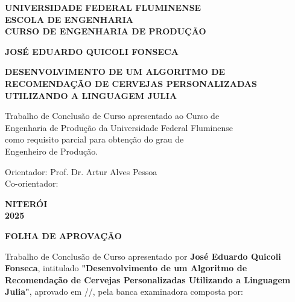 \documentclass[12pt,a4paper]{article}
\begin{document}
\begin{titlepage}
\begin{center}
\large
\textbf{UNIVERSIDADE FEDERAL FLUMINENSE}\\
\textbf{ESCOLA DE ENGENHARIA}\\
\textbf{CURSO DE ENGENHARIA DE PRODUÇÃO}

\vspace{4cm}

\Large
\textbf{JOSÉ EDUARDO QUICOLI FONSECA}

\vspace{3cm}

\Large
\textbf{DESENVOLVIMENTO DE UM ALGORITMO DE RECOMENDAÇÃO DE CERVEJAS PERSONALIZADAS UTILIZANDO A LINGUAGEM JULIA}

\vspace{3cm}

\large
Trabalho de Conclusão de Curso apresentado ao Curso de\\
Engenharia de Produção da Universidade Federal Fluminense\\
como requisito parcial para obtenção do grau de\\
Engenheiro de Produção.

\vspace{2cm}

\begin{flushleft}
\large
Orientador: Prof. Dr. Artur Alves Pessoa\\
Co-orientador: \underline{\hspace{6cm}}
\end{flushleft}

\vfill

\large
\textbf{NITERÓI}\\
\textbf{2025}
\end{center}
\end{titlepage}

\newpage
\begin{center}
\Large
\textbf{FOLHA DE APROVAÇÃO}
\end{center}

\vspace{2cm}

Trabalho de Conclusão de Curso apresentado por \textbf{José Eduardo Quicoli Fonseca}, intitulado \textbf{"Desenvolvimento de um Algoritmo de Recomendação de Cervejas Personalizadas Utilizando a Linguagem Julia"}, aprovado em \underline{\hspace{1cm}}/\underline{\hspace{1cm}}/\underline{\hspace{2cm}}, pela banca examinadora composta por:
\end{document}
